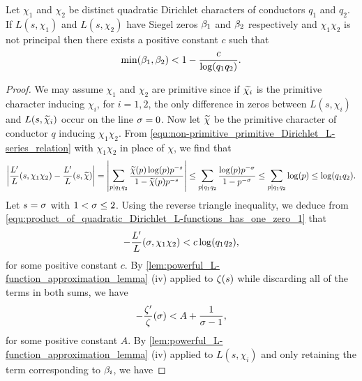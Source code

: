    \begin{proposition}\label{prop:product_of_quadratic_Dirichlet_L-functions_has_one_zero}
      Let $\chi_{1}$ and $\chi_{2}$ be distinct quadratic Dirichlet characters of conductors $q_{1}$ and $q_{2}$. If $L(s,\chi_{1})$ and $L(s,\chi_{2})$ have Siegel zeros $\beta_{1}$ and $\beta_{2}$ respectively and $\chi_{1}\chi_{2}$ is not principal then there exists a positive constant $c$ such that
      \[
        \min(\beta_{1},\beta_{2}) < 1-\frac{c}{\log(q_{1}q_{2})}.
      \]
    \end{proposition}
    \begin{proof}
        We may assume $\chi_{1}$ and $\chi_{2}$ are primitive since if $\widetilde{\chi_{i}}$ is the primitive character inducing $\chi_{i}$, for $i = 1,2$, the only difference in zeros between $L(s,\chi_{i})$ and $L(s,\widetilde{\chi}_{i})$ occur on the line $\sigma = 0$. Now let $\widetilde{\chi}$ be the primitive character of conductor $q$ inducing $\chi_{1}\chi_{2}$. From \cref{equ:non-primitive_primitive_Dirichlet_L-series_relation} with $\chi_{1}\chi_{2}$ in place of $\chi$, we find that
        \begin{equation}\label{equ:product_of_quadratic_Dirichlet_L-functions_has_one_zero_1}
          \left|\frac{L'}{L}(s,\chi_{1}\chi_{2})-\frac{L'}{L}(s,\widetilde{\chi})\right| = \left|\sum_{p \mid q_{1}q_{2}}\frac{\widetilde{\chi}(p)\log(p)p^{-s}}{1-\widetilde{\chi}(p)p^{-s}}\right| \le \sum_{p \mid q_{1}q_{2}}\frac{\log(p)p^{-\sigma}}{1-p^{-\sigma}} \le \sum_{p \mid q_{1}q_{2}}\log(p) \le \log(q_{1}q_{2}).
        \end{equation}
        Let $s = \sigma$ with $1 < \sigma \le 2$. Using the reverse triangle inequality, we deduce from \cref{equ:product_of_quadratic_Dirichlet_L-functions_has_one_zero_1} that
        \begin{equation}\label{equ:product_of_quadratic_Dirichlet_L-functions_has_one_zero_2}
          -\frac{L'}{L}(\sigma,\chi_{1}\chi_{2}) < c\log(q_{1}q_{2}),
        \end{equation}
        for some positive constant $c$.
        By \cref{lem:powerful_L-function_approximation_lemma} (iv) applied to $\zeta(s)$ while discarding all of the terms in both sums, we have
        \begin{equation}\label{equ:product_of_quadratic_Dirichlet_L-functions_has_one_zero_3}
          -\frac{\zeta'}{\zeta}(\sigma) < A+\frac{1}{\sigma-1},
        \end{equation}
        for some positive constant $A$. By \cref{lem:powerful_L-function_approximation_lemma} (iv) applied to $L(s,\chi_{i})$ and only retaining the term corresponding to $\beta_{i}$, we have

\end{proof}
